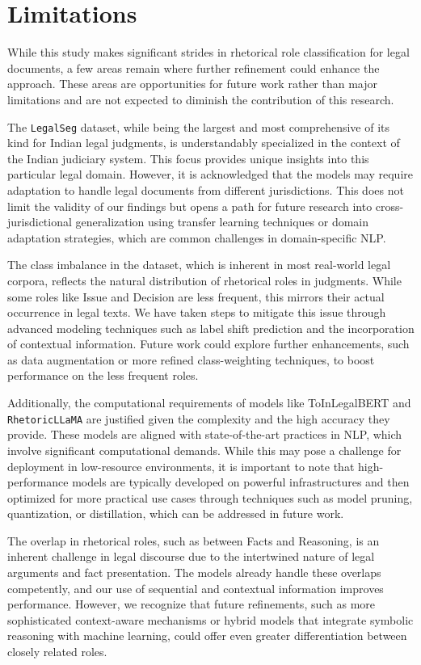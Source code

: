 \section*{Limitations}
While this study makes significant strides in rhetorical role classification for legal documents, a few areas remain where further refinement could enhance the approach. These areas are opportunities for future work rather than major limitations and are not expected to diminish the contribution of this research.

The \texttt{LegalSeg} dataset, while being the largest and most comprehensive of its kind for Indian legal judgments, is understandably specialized in the context of the Indian judiciary system. This focus provides unique insights into this particular legal domain. However, it is acknowledged that the models may require adaptation to handle legal documents from different jurisdictions. This does not limit the validity of our findings but opens a path for future research into cross-jurisdictional generalization using transfer learning techniques or domain adaptation strategies, which are common challenges in domain-specific NLP.

The class imbalance in the dataset, which is inherent in most real-world legal corpora, reflects the natural distribution of rhetorical roles in judgments. While some roles like Issue and Decision are less frequent, this mirrors their actual occurrence in legal texts. We have taken steps to mitigate this issue through advanced modeling techniques such as label shift prediction and the incorporation of contextual information. Future work could explore further enhancements, such as data augmentation or more refined class-weighting techniques, to boost performance on the less frequent roles.

Additionally, the computational requirements of models like ToInLegalBERT and \texttt{RhetoricLLaMA} are justified given the complexity and the high accuracy they provide. These models are aligned with state-of-the-art practices in NLP, which involve significant computational demands. While this may pose a challenge for deployment in low-resource environments, it is important to note that high-performance models are typically developed on powerful infrastructures and then optimized for more practical use cases through techniques such as model pruning, quantization, or distillation, which can be addressed in future work.

The overlap in rhetorical roles, such as between Facts and Reasoning, is an inherent challenge in legal discourse due to the intertwined nature of legal arguments and fact presentation. The models already handle these overlaps competently, and our use of sequential and contextual information improves performance. However, we recognize that future refinements, such as more sophisticated context-aware mechanisms or hybrid models that integrate symbolic reasoning with machine learning, could offer even greater differentiation between closely related roles.

